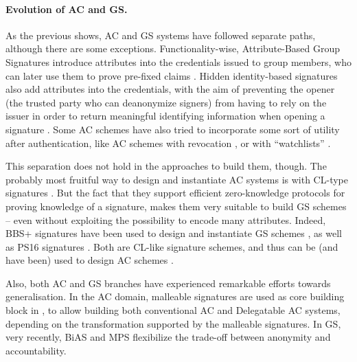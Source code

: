 \paragraph{Evolution of AC and GS.} %
As the previous shows, AC and GS systems have followed separate paths, although
there are some exceptions. Functionality-wise, Attribute-Based Group Signatures
introduce attributes into the credentials issued to group members, who can later
use them to prove pre-fixed claims \cite{emo09,aa14}. Hidden identity-based
signatures also add attributes into the credentials, with the aim of preventing
the opener (the trusted party who can deanonymize signers) from having to rely
on the issuer in order to return meaningful identifying information when opening
a signature \cite{ks07}. Some AC schemes have also tried to incorporate some
sort of utility after authentication, like AC schemes with revocation
\cite{cks10}, or with ``watchlists'' \needcite.

This separation does not hold in the approaches to build them, though. The
probably most fruitful way to design and instantiate AC systems
is with CL-type signatures \cite{cl02}. But the fact that they support efficient
zero-knowledge protocols for proving knowledge of a signature, makes them very
suitable to build GS schemes -- even without exploiting the possibility to
encode many attributes. Indeed, BBS+ signatures \cite{bbs04,cdl16b} have been
used to design and instantiate GS schemes \cite{gl19,dl21}, as well as  PS16
signatures \cite{ps16,cdl+20}. Both are CL-like signature schemes, and thus
can be (and have been) used to design AC schemes \needcite.

Also, both AC and GS branches have experienced remarkable efforts towards
generalisation. In the AC domain, malleable signatures are used as core building
block in \cite{cklm14}, to allow building both conventional AC and Delegatable
AC systems, depending on the transformation supported by the malleable
signatures. In GS, very recently, BiAS \cite{lnpy21} and MPS \cite{ngsy22}
flexibilize the trade-off between anonymity and accountability.

